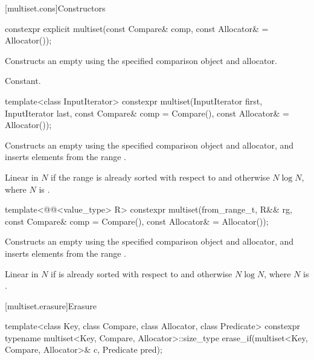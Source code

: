 [multiset.cons]{Constructors}

%
\begin{itemdecl}
constexpr explicit multiset(const Compare& comp, const Allocator& = Allocator());
\end{itemdecl}

\begin{itemdescr}
\pnum
\effects
Constructs an empty  using the specified comparison object and allocator.

\pnum
\complexity
Constant.
\end{itemdescr}

%
\begin{itemdecl}
template<class InputIterator>
  constexpr multiset(InputIterator first, InputIterator last,
                     const Compare& comp = Compare(), const Allocator& = Allocator());
\end{itemdecl}

\begin{itemdescr}
\pnum
\effects
Constructs an empty
using the specified comparison object and allocator,
and inserts elements from the range
.

\pnum
\complexity
Linear in $N$
if the range
is already sorted with respect to  and otherwise $N \log N$,
where $N$ is
.
\end{itemdescr}

%
\begin{itemdecl}
template<@@<value_type> R>
  constexpr multiset(from_range_t, R&& rg, const Compare& comp = Compare(),
                     const Allocator& = Allocator());
\end{itemdecl}

\begin{itemdescr}
\pnum
\effects
Constructs an empty 
using the specified comparison object and allocator, and
inserts elements from the range .

\pnum
\complexity
Linear in $N$ if  is already sorted with respect to  and
otherwise $N \log N$, where $N$ is .
\end{itemdescr}

[multiset.erasure]{Erasure}

%
\begin{itemdecl}
template<class Key, class Compare, class Allocator, class Predicate>
  constexpr typename multiset<Key, Compare, Allocator>::size_type
    erase_if(multiset<Key, Compare, Allocator>& c, Predicate pred);
\end{itemdecl}

